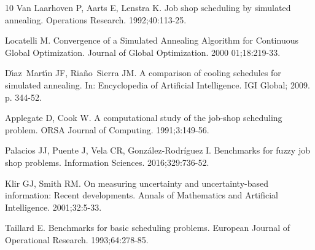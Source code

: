 \documentclass[icae]{iosart2x}
\begin{document}
\begin{thebibliography}{10}
{Van Laarhoven} P, Aarts E, Lenstra K.
\newblock Job shop scheduling by simulated annealing.
\newblock Operations Research. 1992;40:113-25.

Locatelli M.
\newblock Convergence of a Simulated Annealing Algorithm for Continuous Global
  Optimization.
\newblock Journal of Global Optimization. 2000 01;18:219-33.

D\'{\i}az~Mart\'{\i}n JF, Ria{\~n}o~Sierra JM.
\newblock A comparison of cooling schedules for simulated annealing.
\newblock In: Encyclopedia of Artificial Intelligence. IGI Global; 2009. p.
  344-52.

Applegate D, Cook W.
\newblock A computational study of the job-shop scheduling problem.
\newblock ORSA Journal of Computing. 1991;3:149-56.

Palacios JJ, Puente J, Vela CR, Gonz\'alez-Rodr\'iguez I.
\newblock Benchmarks for fuzzy job shop problems.
\newblock Information Sciences. 2016;329:736-52.

Klir GJ, Smith RM.
\newblock On measuring uncertainty and uncertainty-based information: Recent
  developments.
\newblock Annals of Mathematics and Artificial Intelligence. 2001;32:5-33.

Taillard E.
\newblock Benchmarks for basic scheduling problems.
\newblock European Journal of Operational Research. 1993;64:278-85.

\end{thebibliography}
\end{document}
